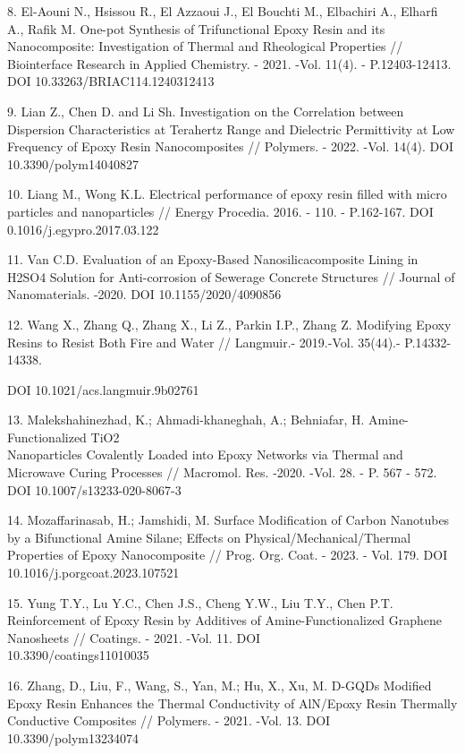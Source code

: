 \begin{references}
8. El-Aouni N., Hsissou R., El Azzaoui J., El Bouchti M., Elbachiri A.,
Elharfi A., Rafik M. One-pot Synthesis of Trifunctional Epoxy Resin
and its Nanocomposite: Investigation of Thermal and Rheological
Properties // Biointerface Research in Applied Chemistry. - 2021.
-Vol. 11(4). - P.12403-12413. DOI 10.33263/BRIAC114.1240312413

9. Lian Z., Chen D. and Li Sh. Investigation on the Correlation between
Dispersion Characteristics at Terahertz Range and Dielectric
Permittivity at Low Frequency of Epoxy Resin Nanocomposites //
Polymers. - 2022. -Vol. 14(4). DOI 10.3390/polym14040827

10. Liang M., Wong K.L. Electrical performance of epoxy resin filled with
micro particles and nanoparticles // Energy Procedia. 2016. - 110. -
P.162-167. DOI 0.1016/j.egypro.2017.03.122

11. Van C.D. Evaluation of an Epoxy-Based Nanosilicacomposite Lining in
H2SO4 Solution for Anti-corrosion of Sewerage Concrete Structures //
Journal of Nanomaterials. -2020. DOI 10.1155/2020/4090856

12. Wang X., Zhang Q., Zhang X., Li Z., Parkin I.P., Zhang Z. Modifying
Epoxy Resins to Resist Both Fire and Water // Langmuir.- 2019.-Vol.
35(44).- P.14332-14338.

DOI 10.1021/acs.langmuir.9b02761


13. Malekshahinezhad, K.; Ahmadi-khaneghah, A.; Behniafar, H.
Amine-Functionalized TiO2 \\Nanoparticles Covalently Loaded into Epoxy
Networks via Thermal and Microwave Curing Processes // Macromol. Res.
-2020. -Vol. 28. - P. 567 - 572. DOI 10.1007/s13233-020-8067-3

14. Mozaffarinasab, H.; Jamshidi, M. Surface Modification of Carbon
Nanotubes by a Bifunctional Amine Silane; Effects on
Physical/Mechanical/Thermal Properties of Epoxy Nanocomposite // Prog.
Org. Coat. - 2023. - Vol. 179. DOI 10.1016/j.porgcoat.2023.107521

15. Yung T.Y., Lu Y.C., Chen J.S., Cheng Y.W., Liu T.Y., Chen P.T.
Reinforcement of Epoxy Resin by Additives of Amine-Functionalized
Graphene Nanosheets // Coatings. - 2021. -Vol. 11. DOI
\\10.3390/coatings11010035

16. Zhang, D., Liu, F., Wang, S., Yan, M.; Hu, X., Xu, M. D-GQDs Modified
Epoxy Resin Enhances the Thermal Conductivity of AlN/Epoxy Resin
Thermally Conductive Composites // Polymers. - 2021. -Vol. 13. DOI
10.3390/polym13234074


\end{references}
